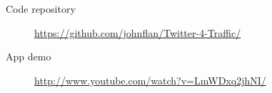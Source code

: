 \begin{description}
    \item[Code repository] \url{https://github.com/johnflan/Twitter-4-Traffic/} 
    \item[App demo] \url{http://www.youtube.com/watch?v=LmWDxq2jhNI/}
\end{description}
